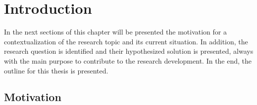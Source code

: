 \newcommand{\novathesis}{\emph{novathesis}}
\newcommand{\novathesisclass}{\texttt{novathesis.cls}}


\chapter{Introduction}
\label{cha:introduction}

In the next sections of this chapter will be presented the motivation for a contextualization of the research topic and its current situation. In addition, the research question is identified and their hypothesized solution is presented, always with the main purpose to contribute to the research development. In the end, the outline for this thesis is presented.


\section{Motivation} %
\label{sec:motivation}



